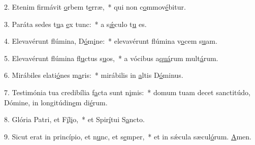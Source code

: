 2. Etenim firmávit \uline{o}rbem t\uline{e}rræ,~* qui non c\uline{o}mmov\uline{é}bitur.\par 
3. Paráta sedes t\uline{u}a \uline{e}x tunc:~* a s\uline{ǽ}culo t\uline{u} es.\par 
4. Elevavérunt flúmina, D\uline{ó}m\uline{i}ne:~* elevavérunt flúmina v\uline{o}cem s\uline{u}am.\par 
5. Elevavérunt flúmina fl\uline{u}ctus s\uline{u}os,~* a vócibus a\uline{quá}rum mult\uline{á}rum.\par 
6. Mirábiles elati\uline{ó}nes m\uline{a}ris:~* mirábilis in \uline{a}ltis D\uline{ó}minus.\par 
7. Testimónia tua credibília f\uline{a}cta sunt n\uline{i}mis:~* domum tuam decet sanctitúdo, Dómine, in longitúdin\uline{e}m di\uline{é}rum.\par 
8. Glória Patri, et F\uline{í}l\uline{i}o,~* et Spir\uline{í}tui S\uline{a}ncto.\par 
9. Sicut erat in princípio, et n\uline{u}nc, et s\uline{e}mper,~* et in sǽcula sæcul\uline{ó}rum. \uline{A}men.\par 
